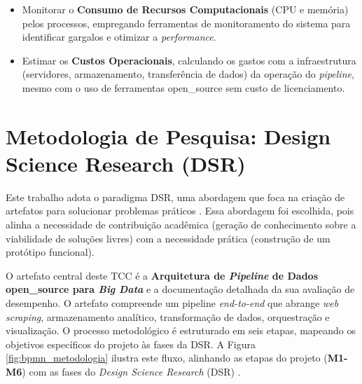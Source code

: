 \begin{enumerate}
\begin{itemize}
        \item Monitorar o \textbf{Consumo de Recursos Computacionais} (CPU e memória) pelos processos, empregando ferramentas de monitoramento do sistema para identificar gargalos e otimizar a \textit{performance}.
        
        \item Estimar os \textbf{Custos Operacionais}, calculando os gastos com a infraestrutura (servidores, armazenamento, transferência de dados) da operação do \textit{pipeline}, mesmo com o uso de ferramentas \acs{open_source} sem custo de licenciamento.
    \end{itemize}

\end{enumerate}

\section{Metodologia de Pesquisa: Design Science Research (DSR)}
\label{sec:metodologia}

Este trabalho adota o paradigma \ac{DSR}, uma abordagem que foca na criação de artefatos para solucionar problemas práticos \cite[]{peffers2012design}. Essa abordagem foi escolhida, pois alinha a necessidade de contribuição acadêmica (geração de conhecimento sobre a viabilidade de soluções livres) com a necessidade prática (construção de um protótipo funcional).

O artefato central deste TCC é a \textbf{Arquitetura de \textit{Pipeline} de Dados \acs{open_source} para \textit{Big Data}} e a documentação detalhada da sua avaliação de desempenho. O artefato compreende um pipeline \textit{end-to-end} que abrange \textit{web scraping}, armazenamento analítico, transformação de dados, orquestração e visualização. O processo metodológico é estruturado em seis etapas, mapeando os objetivos específicos do projeto às fases da DSR. A Figura \ref{fig:bpmn_metodologia} ilustra este fluxo, alinhando as etapas do projeto (\textbf{M1-M6}) com as fases do \textit{Design Science Research} (DSR) \cite[]{peffers2012design}.

